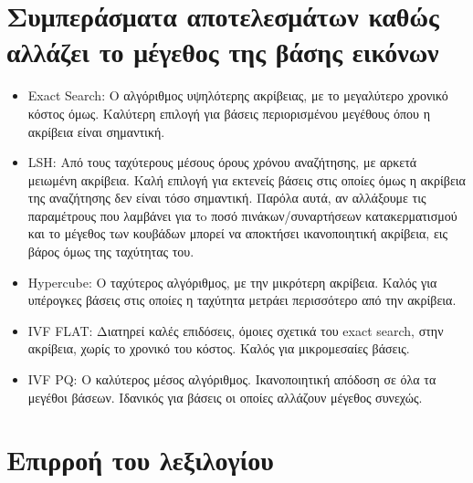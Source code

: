 \documentclass [conference]{IEEEtran}
\begin{document}
\section{Συμπεράσματα αποτελεσμάτων καθώς αλλάζει το μέγεθος της βάσης εικόνων}
\begin{itemize}
    

    \item Exact Search:\newline
    Ο αλγόριθμος υψηλότερης ακρίβειας, με το μεγαλύτερο χρονικό κόστος όμως. Καλύτερη επιλογή για βάσεις περιορισμένου μεγέθους όπου η ακρίβεια είναι σημαντική.

    \item LSH:\newline
    Από τους ταχύτερους μέσους όρους χρόνου αναζήτησης, με αρκετά μειωμένη ακρίβεια. Καλή επιλογή για εκτενείς βάσεις στις οποίες όμως η ακρίβεια της αναζήτησης δεν είναι τόσο σημαντική. Παρόλα αυτά, αν αλλάξουμε τις παραμέτρους που λαμβάνει για τo ποσό πινάκων/συναρτήσεων κατακερματισμού και το μέγεθος των κουβάδων μπορεί να αποκτήσει ικανοποιητική ακρίβεια, εις βάρος όμως της ταχύτητας του.

    \item Hypercube:\newline
    Ο ταχύτερος αλγόριθμος, με την μικρότερη ακρίβεια. Καλός για υπέρογκες βάσεις στις οποίες η ταχύτητα μετράει περισσότερο από την ακρίβεια.

    \item IVF FLAT:\newline
    Διατηρεί καλές επιδόσεις, όμοιες σχετικά του exact search, στην ακρίβεια, χωρίς το χρονικό του κόστος. Καλός για μικρομεσαίες βάσεις.

    \item IVF PQ: \newline
    Ο καλύτερος μέσος αλγόριθμος. Ικανοποιητική απόδοση σε όλα τα μεγέθοι βάσεων. Ιδανικός για βάσεις οι οποίες αλλάζουν μέγεθος συνεχώς.

\end{itemize}

\section{Επιρροή του λεξιλογίου}
\end{document}
